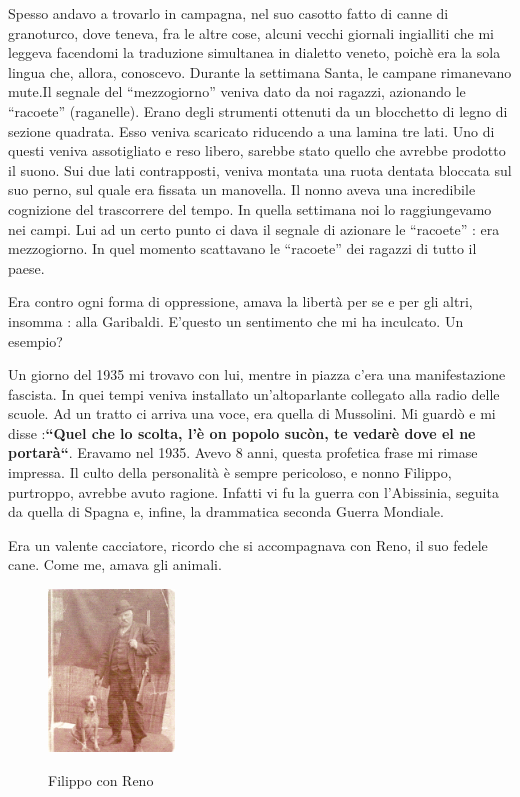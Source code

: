 \documentclass[a4paper,10pt]{book}
\begin{document}
Spesso andavo a trovarlo in campagna, nel suo casotto fatto di canne di granoturco, dove teneva, fra le altre cose, alcuni vecchi giornali ingialliti che mi leggeva facendomi la traduzione simultanea in dialetto veneto, poichè era la sola lingua che, allora, conoscevo.\newline
Durante la settimana Santa, le campane rimanevano mute.Il segnale del “mezzogiorno” veniva dato da noi ragazzi, azionando le “racoete” (raganelle). Erano degli strumenti ottenuti da un blocchetto di legno di sezione quadrata. Esso veniva scaricato riducendo a una lamina tre lati. Uno di questi veniva assotigliato e reso libero, sarebbe stato quello che avrebbe prodotto il suono. Sui due lati contrapposti, veniva montata una ruota dentata bloccata sul suo perno, sul quale era fissata un manovella.\newline
Il nonno aveva una incredibile cognizione del trascorrere del tempo. In quella settimana noi lo raggiungevamo nei campi. Lui ad un certo punto ci dava il segnale  di azionare le “racoete” : era mezzogiorno.  In quel momento scattavano le “racoete” dei ragazzi di tutto il paese.
 
Era contro ogni forma di oppressione, amava la libertà per se e per gli altri, insomma : alla Garibaldi. E’questo un sentimento  che mi ha inculcato. Un esempio? 

Un giorno del 1935 mi trovavo con lui, mentre in piazza c’era una manifestazione fascista. In quei tempi veniva installato un’altoparlante collegato alla radio delle scuole. Ad un tratto ci arriva una voce, era quella di Mussolini. Mi guardò e mi disse :\textbf{``Quel che lo scolta, l’è on popolo sucòn, te vedarè dove el ne portarà``}. Eravamo nel 1935. Avevo 8 anni, questa profetica frase mi rimase impressa. Il culto della personalità è sempre pericoloso, e nonno Filippo, purtroppo, avrebbe avuto ragione.\newline
Infatti vi fu la guerra con l’Abissinia, seguita da quella di Spagna e, infine, la drammatica seconda Guerra Mondiale. 

Era un valente cacciatore, ricordo che si accompagnava con Reno, il suo fedele cane. Come me, amava gli animali.

\begin{figure}[htp]
\centering
\includegraphics[width=0.3\textwidth]{../img/10-filippo.png}\label{fig:10-filippo.png}
\caption{Filippo con Reno}
\end{figure}
\end{document}
